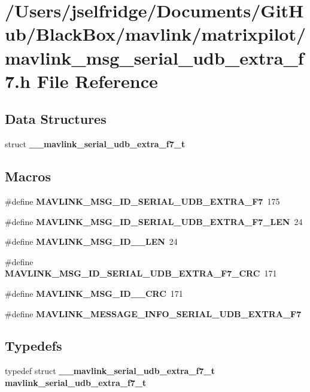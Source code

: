 \section{/\+Users/jselfridge/\+Documents/\+Git\+Hub/\+Black\+Box/mavlink/matrixpilot/mavlink\+\_\+msg\+\_\+serial\+\_\+udb\+\_\+extra\+\_\+f7.h File Reference}
\label{mavlink__msg__serial__udb__extra__f7_8h}
\subsection*{Data Structures}
\begin{DoxyCompactItemize}
\item 
struct \textbf{ \+\_\+\+\_\+mavlink\+\_\+serial\+\_\+udb\+\_\+extra\+\_\+f7\+\_\+t}
\end{DoxyCompactItemize}
\subsection*{Macros}
\begin{DoxyCompactItemize}
\item 
\#define \textbf{ M\+A\+V\+L\+I\+N\+K\+\_\+\+M\+S\+G\+\_\+\+I\+D\+\_\+\+S\+E\+R\+I\+A\+L\+\_\+\+U\+D\+B\+\_\+\+E\+X\+T\+R\+A\+\_\+\+F7}~175
\item 
\#define \textbf{ M\+A\+V\+L\+I\+N\+K\+\_\+\+M\+S\+G\+\_\+\+I\+D\+\_\+\+S\+E\+R\+I\+A\+L\+\_\+\+U\+D\+B\+\_\+\+E\+X\+T\+R\+A\+\_\+\+F7\+\_\+\+L\+EN}~24
\item 
\#define \textbf{ M\+A\+V\+L\+I\+N\+K\+\_\+\+M\+S\+G\+\_\+\+I\+D\+\_\+\_\+\+L\+EN}~24
\item 
\#define \textbf{ M\+A\+V\+L\+I\+N\+K\+\_\+\+M\+S\+G\+\_\+\+I\+D\+\_\+\+S\+E\+R\+I\+A\+L\+\_\+\+U\+D\+B\+\_\+\+E\+X\+T\+R\+A\+\_\+\+F7\+\_\+\+C\+RC}~171
\item 
\#define \textbf{ M\+A\+V\+L\+I\+N\+K\+\_\+\+M\+S\+G\+\_\+\+I\+D\+\_\+\_\+\+C\+RC}~171
\item 
\#define \textbf{ M\+A\+V\+L\+I\+N\+K\+\_\+\+M\+E\+S\+S\+A\+G\+E\+\_\+\+I\+N\+F\+O\+\_\+\+S\+E\+R\+I\+A\+L\+\_\+\+U\+D\+B\+\_\+\+E\+X\+T\+R\+A\+\_\+\+F7}
\end{DoxyCompactItemize}
\subsection*{Typedefs}
\begin{DoxyCompactItemize}
\item 
typedef struct \textbf{ \+\_\+\+\_\+mavlink\+\_\+serial\+\_\+udb\+\_\+extra\+\_\+f7\+\_\+t} \textbf{ mavlink\+\_\+serial\+\_\+udb\+\_\+extra\+\_\+f7\+\_\+t}
\end{DoxyCompactItemize}


